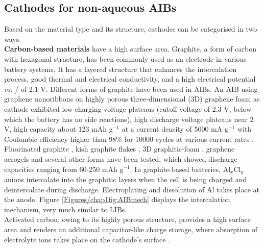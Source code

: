 \subsection{Cathodes for non-aqueous AIBs}
Based on the material type and its structure, cathodes can be categorised in two ways.\\
\textbf{Carbon-based materials} have a high surface area. Graphite, a form of carbon with hexagonal structure, has been commonly used as an electrode in various battery systems. It has a layered structure that enhances the intercalation process, good thermal and electrical conductivity, and a high electrical potential \textit{vs.} / of 2.1 V. Different forms of graphite have been used in AIBs. An AIB using graphene nanoribbons on highly porous three-dimensional (3D) graphene foam as cathode exhibited low charging voltage plateaus (cutoff voltage of 2.3 V, below which the battery has no side reactions), high discharge voltage plateaus near 2 V, high capacity about 123 mAh g$^{-1}$ at a current density of 5000 mA g$^{-1}$ with Coulombic efficiency higher than 98\% for 10000 cycles at various current rates \cite{yu_graphene}. Fluorinated graphite \cite{rani_fluorinated_2013}, kish graphite flakes \cite{wang_kish_2017-1}, 3D graphitic-foam \cite{wu_3d_2016}, graphene aerogels\cite{huang_graphene_2019} and several other forms have been tested, which showed discharge capacities ranging from 60-250 mAh g$^{-1}$. In graphite-based batteries, Al$_x$Cl$_y$ anions intercalate into the graphitic layers when the cell is being charged and deintercalate during discharge. Electroplating and dissolution of Al takes place at the anode. Figure \ref{Figures/chap1fig:AIBmech} displays the intercalation mechanism, very much similar to LIBs.\\
Activated carbon, owing to its highly porous structure, provides a high surface area and renders an additional capacitor-like charge storage, where absorption of electrolyte ions takes place on the cathode's surface \cite{eliad_ion_2001, zhu_carbon-based_2011-2}.\\
